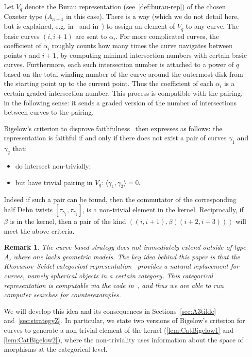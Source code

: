 \documentclass[a4paper]{amsart}
\newcommand{\0}{\mathbf{0}}
\theoremstyle{theorem}
\newtheorem{remark}[theorem]{Remark}
\begin{document}
Let \(V_q\) denote the Burau representation (see~\cref{def:burau-rep}) of the chosen Coxeter type (\(A_{n-1}\) in this case).
There is a way (which we do not detail here, but is explained, e.g. in~\cite{KhS} and in~\cite{Bigelow_Burau}) to assign an element of $V_q$ to any curve.
The basic curves $(i,i+1)$ are sent to $\alpha_i$.
For more complicated curves, the coefficient of $\alpha_i$ roughly counts how many times the curve navigates between points $i$ and $i+1$, by computing minimal intersection numbers with certain basic curves. 
Furthermore, each such intersection number is attached to a power of \(q\) based on the total winding number of the curve around the outermost disk from the starting point up to the current point.
Thus the coefficient of each \(\alpha_i\) is a certain graded intersection number.
This process is compatible with the pairing, in the following sense: it sends a graded version of the number of intersections between curves to the pairing.

Bigelow's criterion to disprove faithfulness~\cite[Theorem 1.4]{Bigelow_Burau} then expresses as follows: the representation is faithful if and only if there does not exist a pair of curves $\gamma_1$ and $\gamma_2$ that:
\begin{itemize}
\item do intersect non-trivially;
\item but have trivial pairing in $V_q$: $\langle \gamma_1,\gamma_2\rangle=0$.
\end{itemize}



Indeed if such a pair can be found, then the commutator of the corresponding half Dehn twists $[\tau_{\gamma_1},\tau_{\gamma_2}]$, is a non-trivial element in the kernel.
Reciprocally, if $\beta$ is in the kernel, then a pair of the kind $((i,i+1),\beta((i+2,i+3)))$ will meet the above criteria.


\begin{remark}\label{rem:general-strategy}
  The curve-based strategy does not immediately extend outside of type $A$, where one lacks geometric models.
  The key idea behind this paper is that the Khovanov--Seidel categorical representation~\cite{KhS} provides a natural replacement for curves, namely spherical objects in a certain category.
  This categorical representation is computable via the code in~\cite{BD_git}, and thus we are able to run computer searches for counterexamples.
\end{remark}

We will develop this idea and its consequences in Sections~\ref{sec:A3tilde} and~\ref{sec:strategyZ}. In particular, we state two versions of Bigelow's criterion for curves to generate a non-trivial element of the kernel (\cref{lem:CatBigelow1} and \cref{lem:CatBigelow2}), where the non-triviality uses information about the space of morphisms at the categorical level.
\end{document}
